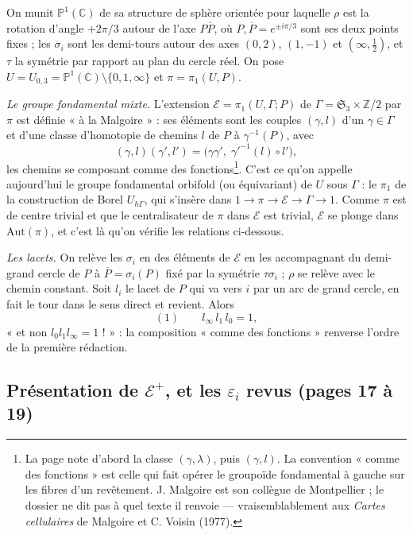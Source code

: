 \documentclass[11pt,a4paper]{article}
\begin{document}
On munit $\mathbb{P}^1(\mathbb{C})$ de sa structure de sphère orientée pour
laquelle $\rho$ est la rotation d'angle $+2\pi/3$ autour de l'axe $P\overline{P}$,
où $P, \overline{P} = e^{\pm i\pi/3}$ sont ses deux points fixes ; les
$\sigma_i$ sont les demi-tours autour des axes $(0, 2)$, $(1, -1)$ et
$(\infty, \frac12)$, et $\tau$ la symétrie par rapport au plan du cercle réel.
On pose $U = U_{0,3} = \mathbb{P}^1(\mathbb{C}) \setminus \{0, 1, \infty\}$ et
$\pi = \pi_1(U, P)$.

\emph{Le groupe fondamental mixte.} L'extension $\mathcal{E} =
\pi_1(U, \Gamma; P)$ de $\Gamma = \mathfrak{S}_3 \times \mathbb{Z}/2$ par $\pi$
est définie « à la Malgoire » : ses éléments sont les couples $(\gamma, l)$ d'un
$\gamma \in \Gamma$ et d'une classe d'homotopie de chemins $l$ de $P$ à
$\gamma^{-1}(P)$, avec
\[
(\gamma, l)(\gamma', l') = \bigl(\gamma\gamma',\; \gamma'^{-1}(l) \circ l'\bigr),
\]
les chemins se composant comme des fonctions\footnote{La page note d'abord la
classe $(\gamma, \lambda)$, puis $(\gamma, l)$. La convention « comme des
fonctions » est celle qui fait opérer le groupoïde fondamental à gauche sur
les fibres d'un revêtement. J. Malgoire est son collègue de Montpellier ; le
dossier ne dit pas à quel texte il renvoie — vraisemblablement aux
\emph{Cartes cellulaires} de Malgoire et C. Voisin (1977).}. C'est ce qu'on
appelle aujourd'hui le groupe fondamental orbifold (ou équivariant) de $U$ sous
$\Gamma$ : le $\pi_1$ de la construction de Borel $U_{h\Gamma}$, qui s'insère
dans $1 \to \pi \to \mathcal{E} \to \Gamma \to 1$. Comme $\pi$ est de centre
trivial et que le centralisateur de $\pi$ dans $\mathcal{E}$ est trivial,
$\mathcal{E}$ se plonge dans $\mathrm{Aut}(\pi)$, et c'est là qu'on vérifie les
relations ci-dessous.

\emph{Les lacets.} On relève les $\sigma_i$ en des éléments de $\mathcal{E}$ en
les accompagnant du demi-grand cercle de $P$ à $\overline{P} = \sigma_i(P)$
fixé par la symétrie $\tau\sigma_i$ ; $\rho$ se relève avec le chemin constant.
Soit $l_i$ le lacet de $P$ qui va vers $i$ par un arc de grand cercle, en fait
le tour dans le sens direct et revient. Alors
\[
(1)\qquad l_\infty\, l_1\, l_0 = 1,
\]
« et non $l_0 l_1 l_\infty = 1$ ! » : la composition « comme des fonctions »
renverse l'ordre de la première rédaction.

\subsection*{Présentation de $\mathcal{E}^{+}$, et les $\varepsilon_i$ revus
(pages 17 à 19)}
\end{document}
